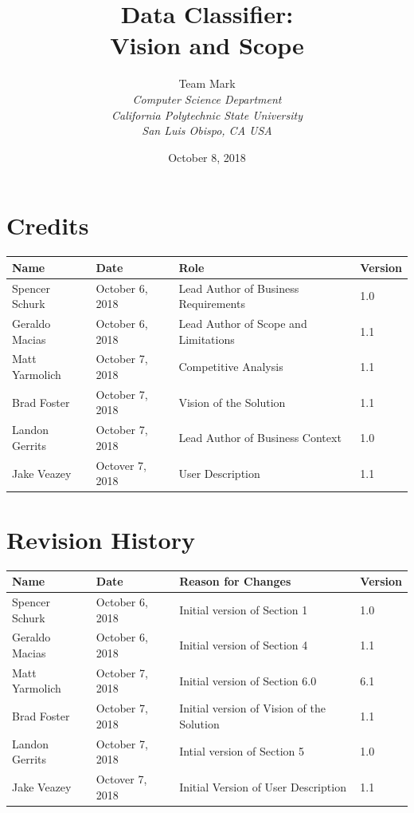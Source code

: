 \documentclass[12pt,oneside,letterpaper]{article}
\begin{document}
\title{\bfseries Data Classifier: \\Vision and Scope}

\author {
\large{Team Mark}\\
\emph{Computer Science Department}\\
\emph{California Polytechnic State University}\\
\emph{San Luis Obispo, CA USA}\\
}

\date{October 8, 2018}
\maketitle \thispagestyle{empty}

\pagebreak
\tableofcontents


\section*{Credits}
\begin{tabular}{|l|l|p{2in}|l|}
\hline
\textbf{Name}&\textbf{Date}&\textbf{Role}&\textbf{Version}\\
\hline
Spencer Schurk&October 6, 2018&Lead Author of Business Requirements&1.0\\
\hline
Geraldo Macias&October 6, 2018&Lead Author of Scope and Limitations&1.1\\
\hline
Matt Yarmolich&October 7, 2018&Competitive Analysis&1.1\\
\hline
Brad Foster&October 7, 2018&Vision of the Solution&1.1\\
\hline
Landon Gerrits&October 7, 2018& Lead Author of Business Context&1.0\\
\hline
Jake Veazey&Octover 7, 2018&User Description&1.1\\
\hline
\end{tabular}


\section*{Revision History}
\begin{tabular}{|l|l|p{2in}|l|}
\hline
\textbf{Name}&\textbf{Date}&\textbf{Reason for Changes}&\textbf{Version}\\
\hline
Spencer Schurk&October 6, 2018&Initial version of Section 1&1.0\\
\hline
Geraldo Macias&October 6, 2018&Initial version of Section 4&1.1\\
\hline
Matt Yarmolich&October 7, 2018&Initial version of Section 6.0&6.1\\
\hline
Brad Foster&October 7, 2018&Initial version of Vision of the Solution&1.1\\
\hline
Landon Gerrits&October 7, 2018&Intial version of Section 5&1.0\\
\hline
Jake Veazey&Octover 7, 2018&Initial Version of User Description&1.1\\
\hline
\end{tabular}
\end{document}
